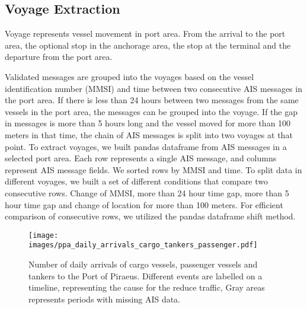 \documentclass[conference]{IEEEtran}
\begin{document}
\subsection{Voyage Extraction}
Voyage represents vessel movement in port area. From the arrival to the port area, the optional stop in the anchorage area, the stop at the terminal and the departure from the port area. %

Validated messages are grouped into the voyages based on the vessel identification number (MMSI) and time between two consecutive AIS messages in the port area. If there is less than 24 hours between two messages from the same vessels in the port area, the messages can be grouped into the voyage. If the gap in messages is more than 5 hours long and the vessel moved for more than 100 meters in that time, the chain of AIS messages is split into two voyages at that point. 
To extract voyages, we built pandas dataframe from AIS messages in a selected port area. Each row represents a single AIS message, and columns represent AIS message fields. We sorted rows by MMSI and time. To split data in different voyages, we built a set of different conditions that compare two consecutive rows. Change of MMSI, more than 24 hour time gap, more than 5 hour time gap and change of location for more than 100 meters. For efficient comparison of consecutive rows, we utilized the pandas dataframe shift method.





\begin{figure*}[ht!]
    \centering
    \texttt{[image: images/ppa\_daily\_arrivals\_cargo\_tankers\_passenger.pdf]}
    \caption{Number of daily arrivals of cargo vessels, passenger vessels and tankers to the Port of Piraeus. Different events are labelled on a timeline, representing the cause for the reduce traffic, Gray areas represents periods with missing AIS data.}\label{fig:ppa_daily_arrivals_cargo_tankers_passenger}
\end{figure*}
\end{document}
